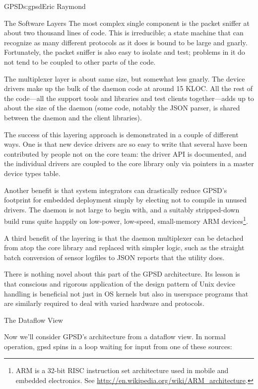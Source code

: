 \begin{aosachapter}{GPSD}{s:gpsd}{Eric Raymond}
\begin{aosasect1}{The Software Layers}
The most complex single component is the packet sniffer at about two
thousand lines of code.  This is irreducible; a state machine
that can recognize as many different protocols as it does is bound to
be large and gnarly.  Fortunately, the packet sniffer is also easy to
isolate and test; problems in it do not tend to be coupled to other
parts of the code.

The multiplexer layer is about same size, but somewhat less gnarly.
The device drivers make up the bulk of the daemon code at around 15
KLOC.  All the rest of the code---all the support tools and libraries
and test clients together---adds up to about the size of the daemon
(some code, notably the JSON parser, is shared between the daemon and
the client libraries).

The success of this layering approach is demonstrated in a couple of
different ways.  One is that new device drivers are so easy to write
that several have been contributed by people not on the core team: the
driver API is documented, and the individual drivers are coupled to
the core library only via pointers in a master device types table.

Another benefit is that system integrators can drastically reduce
GPSD's footprint for embedded deployment simply by electing not to
compile in unused drivers.  The daemon is not large to begin with, and
a suitably stripped-down build runs quite happily on low-power,
low-speed, small-memory ARM devices\footnote{ARM is a 32-bit RISC instruction set architecture used in mobile and embedded electronics. See \url{http://en.wikipedia.org/wiki/ARM_architecture}.}.

A third benefit of the layering is that the daemon multiplexer can be
detached from atop the core library and replaced with simpler logic,
such as the straight batch conversion of sensor logfiles to JSON
reports that the  utility does.

There is nothing novel about this part of the GPSD architecture. Its
lesson is that conscious and rigorous application of the design
pattern of Unix device handling is beneficial not just in OS kernels
but also in userspace programs that are similarly required to deal
with varied hardware and protocols.

\end{aosasect1}

\begin{aosasect1}{The Dataflow View}

Now we'll consider GPSD's architecture from a dataflow view.  In
normal operation, gpsd spins in a loop waiting for input from one of
these sources:


\end{aosasect1}
\end{aosachapter}
